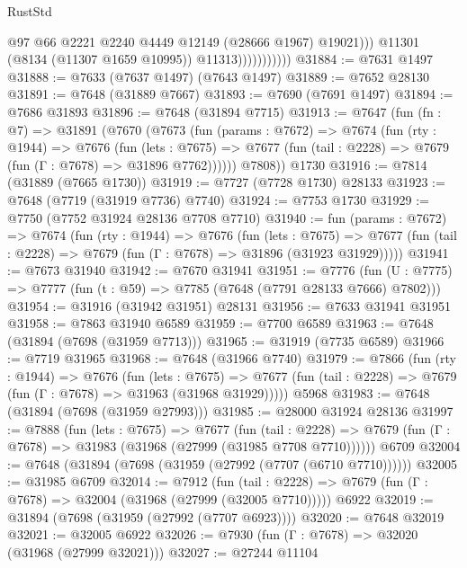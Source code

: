 \begin{lexlean}{RustStd}
\begin{coremodule}
                                @97
                                @66
                                @2221
                                @2240
                                @4449
                                @12149
                                (@28666 @1967)
                                @19021)))
                          @11301
                          (@8134 (@11307 @1659 @10995))
                          @11313)))))))))))
@31884 := @7631 @1497
@31888 := @7633 (@7637 @1497) (@7643 @1497)
@31889 := @7652 @28130
@31891 := @7648 (@31889 @7667)
@31893 := @7690 (@7691 @1497)
@31894 := @7686 @31893
@31896 := @7648 (@31894 @7715)
@31913 := @7647
    (fun (fn : @7) =>
    @31891
      (@7670
        (@7673
          (fun (params : @7672) =>
          @7674
            (fun (rty : @1944) =>
            @7676
              (fun (lets : @7675) =>
              @7677 (fun (tail : @2228) => @7679 (fun (Γ : @7678) => @31896 @7762))))))
        @7808))
    @1730
@31916 := @7814 (@31889 (@7665 @1730))
@31919 := @7727 (@7728 @1730) @28133
@31923 := @7648 (@7719 (@31919 @7736) @7740)
@31924 := @7753 @1730
@31929 := @7750 (@7752 @31924 @28136 @7708 @7710)
@31940 := fun (params : @7672) =>
  @7674
    (fun (rty : @1944) =>
    @7676
      (fun (lets : @7675) =>
      @7677 (fun (tail : @2228) => @7679 (fun (Γ : @7678) => @31896 (@31923 @31929)))))
@31941 := @7673 @31940
@31942 := @7670 @31941
@31951 := @7776
    (fun (U : @7775) => @7777 (fun (t : @59) => @7785 (@7648 (@7791 @28133 @7666) @7802)))
@31954 := @31916 (@31942 @31951) @28131
@31956 := @7633 @31941 @31951
@31958 := @7863 @31940 @6589
@31959 := @7700 @6589
@31963 := @7648 (@31894 (@7698 (@31959 @7713)))
@31965 := @31919 (@7735 @6589)
@31966 := @7719 @31965
@31968 := @7648 (@31966 @7740)
@31979 := @7866
    (fun (rty : @1944) =>
    @7676
      (fun (lets : @7675) =>
      @7677 (fun (tail : @2228) => @7679 (fun (Γ : @7678) => @31963 (@31968 @31929)))))
    @5968
@31983 := @7648 (@31894 (@7698 (@31959 @27993)))
@31985 := @28000 @31924 @28136
@31997 := @7888
    (fun (lets : @7675) =>
    @7677
      (fun (tail : @2228) =>
      @7679 (fun (Γ : @7678) => @31983 (@31968 (@27999 (@31985 @7708 @7710))))))
    @6709
@32004 := @7648 (@31894 (@7698 (@31959 (@27992 (@7707 (@6710 @7710))))))
@32005 := @31985 @6709
@32014 := @7912
    (fun (tail : @2228) => @7679 (fun (Γ : @7678) => @32004 (@31968 (@27999 (@32005 @7710)))))
    @6922
@32019 := @31894 (@7698 (@31959 (@27992 (@7707 @6923))))
@32020 := @7648 @32019
@32021 := @32005 @6922
@32026 := @7930 (fun (Γ : @7678) => @32020 (@31968 (@27999 @32021)))
@32027 := @27244 @11104

\end{coremodule}
\end{lexlean}
